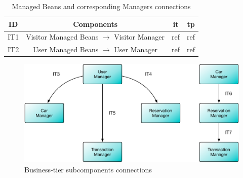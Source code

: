 \vspace{16pt}

\begin{table}[htbp]
\begin{center}
\begin{tabular}[t]{cccc}

\hline
\textbf{ID} & \textbf{Components} & \textbf{\acs{it}} & \textbf{\acs{tp}}\\
\hline
IT1 & \enspace Visitor Managed Beans $\rightarrow$ Visitor Manager \enspace & ref & ref\\
\hline
IT2 & \enspace User Managed Beans $\rightarrow$ User Manager \enspace & ref & ref\\
\hline

\end{tabular}
\caption{Managed Beans and corresponding Managers connections}
\end{center}
\end{table}

\clearpage

\vspace{120pt}
\begin{figure}[htbp]
\centering
\includegraphics[width=\textwidth]{Images/IT3-7.pdf}
\vspace{16pt}
\caption{Business-tier subcomponents connections}
\label{fig:it3-7}
\end{figure}

\vspace{16pt}

